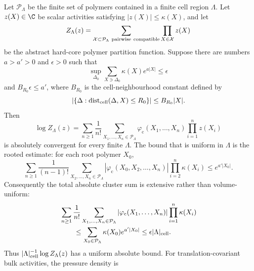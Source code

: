 \begin{theorem}
\label{thm:constructive-kp-cluster-convergence}
Let \(\mathcal P_\Lambda\) be the finite set of polymers contained in a finite
cell region \(\Lambda\).  Let \(z(X)\in\C\) be scalar activities satisfying
\(|z(X)|\leq\kappa(X)\), and let
\[
  Z_\Lambda(z)
  =
  \sum_{\mathcal X\subset\mathcal P_\Lambda\ {\rm pairwise\ compatible}}
  \prod_{X\in\mathcal X}z(X)
\]
be the abstract hard-core polymer partition function.  Suppose there are
numbers \(a>a'>0\) and \(\epsilon>0\) such that
\begin{equation}
  \sup_{\Delta_0}
  \sum_{X\ni\Delta_0}
  \kappa(X)e^{a|X|}
  \leq
  \epsilon
  \label{eq:constructive-kp-smallness}
\end{equation}
and \(B_{R_0}\epsilon\leq a'\), where \(B_{R_0}\) is the cell-neighbourhood
constant defined by
\[
  |\{\Delta:\operatorname{dist}_{\rm cell}(\Delta,X)\leq R_0\}|
  \leq B_{R_0}|X|.
\]
Then
\begin{equation}
  \log Z_\Lambda(z)
  =
  \sum_{n\geq1}\frac1{n!}
  \sum_{X_1,\ldots,X_n\in\mathcal P_\Lambda}
  \varphi_{\mathrm c}(X_1,\ldots,X_n)
  \prod_{i=1}^nz(X_i)
  \label{eq:constructive-cluster-expansion}
\end{equation}
is absolutely convergent for every finite \(\Lambda\).  The bound that is
uniform in \(\Lambda\) is the rooted estimate: for each root polymer \(X_0\),
\begin{equation}
  \sum_{n\geq1}\frac1{(n-1)!}
  \sum_{X_2,\ldots,X_n\in\mathcal P_\Lambda}
  |\varphi_{\mathrm c}(X_0,X_2,\ldots,X_n)|
  \prod_{i=2}^n\kappa(X_i)
  \leq
  e^{a'|X_0|}.
  \label{eq:constructive-rooted-tree-bound}
\end{equation}
Consequently the total absolute cluster sum is extensive rather than
volume-uniform:
\begin{equation}
\begin{aligned}
  &\sum_{n\geq1}\frac1{n!}
  \sum_{X_1,\ldots,X_n\in\mathcal P_\Lambda}
  |\varphi_{\mathrm c}(X_1,\ldots,X_n)|
  \prod_{i=1}^n\kappa(X_i)                                      \\
  &\qquad\leq
  \sum_{X_0\in\mathcal P_\Lambda}\kappa(X_0)e^{a'|X_0|}
  \leq
  \epsilon |\Lambda|_{\rm cell}.
\end{aligned}
\label{eq:constructive-extensive-logz-bound}
\end{equation}
Thus \(|\Lambda|_{\rm cell}^{-1}\log Z_\Lambda(z)\) has a uniform absolute
bound.  For translation-covariant bulk activities, the pressure density is

\end{theorem}
